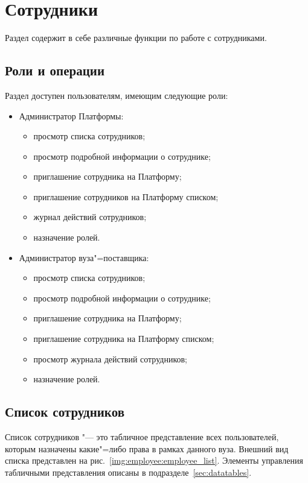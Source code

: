 \graphicspath{ {images/employee/} }
\section{Сотрудники}
Раздел  содержит в себе различные функции по работе с сотрудниками. 

\subsection{Роли и операции}
Раздел доступен пользователям, имеющим следующие роли:
\begin{itemize}
	\item Администратор Платформы:
	\begin{itemize}
		\item просмотр списка сотрудников;
		\item просмотр подробной информации о сотруднике;
		\item приглашение сотрудника на Платформу;
		\item приглашение сотрудников на Платформу списком;
		\item журнал действий сотрудников;
		\item назначение ролей.
	\end{itemize}
	\item Администратор вуза"=поставщика:
	\begin{itemize}
		\item просмотр списка сотрудников;
		\item просмотр подробной информации о сотруднике;
		\item приглашение сотрудника на Платформу;
		\item приглашение сотрудника на Платформу списком;
		\item просмотр журнала действий сотрудников;
		\item назначение ролей.
	\end{itemize}
\end{itemize}

\subsection{Список сотрудников}
Список сотрудников "--- это табличное представление всех пользователей, 
которым назначены какие"=либо права в рамках данного вуза.
Внешний вид списка представлен на рис.~\ref{img:employee:employee_list}.
Элементы управления табличными представления описаны в подразделе~\ref{sec:datatables}.

